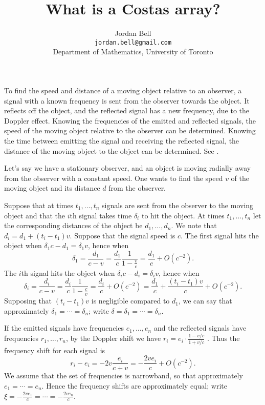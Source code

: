 \documentclass[10pt]{article}
\begin{document}
\title{What is a Costas array?}
\author{Jordan Bell\\ \texttt{jordan.bell@gmail.com}\\Department of Mathematics, University of Toronto}

\maketitle

To find the speed and distance
of a moving object relative to an observer,
a signal with a known frequency is sent from the observer towards the object.
It reflects off the object, and the reflected signal has a new frequency,
due to the Doppler effect. Knowing the frequencies of the emitted and
reflected signals, the speed
of the moving object relative to the observer can be determined.
Knowing the time between emitting the signal and receiving the
reflected signal, the distance of the moving object to the object
can be determined. See \cite[p. 74]{levanon}.

Let's say we have a stationary observer, and an object is moving radially
away from the observer with a constant speed. One wants to find the
speed $v$ of the moving object and its distance $d$
from the observer.   

Suppose that at times $t_1,\ldots,t_n$ signals are sent from the observer
to the moving object and that the $i$th signal takes time $\delta_i$
to hit the object.
At times $t_1,\ldots,t_n$ let the corresponding distances of the
object be $d_1,\ldots,d_n$. We note that
$d_i=d_1+(t_i-t_1)v$.
Suppose that the signal speed is $c$.
The first signal hits the object when $\delta_1 c-d_1=\delta_1 v$, hence when
\[
\delta_1=\frac{d_1}{c-v}=\frac{d_1}{c}\frac{1}{1-\frac{v}{c}}=\frac{d_1}{c}
+O(c^{-2}).
\]
The $i$th signal hits the object when $\delta_ic-d_i=\delta_iv$, hence when
\[
\delta_i=\frac{d_i}{c-v}=\frac{d_i}{c}\frac{1}{1-\frac{c}{v}}
=\frac{d_i}{c}+O(c^{-2})
=\frac{d_1}{c}+\frac{(t_i-t_1)v}{c}+O(c^{-2}).
\]
Supposing that $(t_i-t_1)v$ is negligible compared to $d_1$,
we can say that approximately $\delta_1=\cdots=\delta_n$;
write $\delta=\delta_1=\cdots=\delta_n$.

If the emitted signals have frequencies $e_1,\ldots,e_n$ and
the reflected signals have frequencies $r_1,\ldots,r_n$, 
by the Doppler shift we have $r_i=e_i\cdot \frac{1-v/c}{1+v/c}$
\cite[p. 4]{levanon}. Thus
the frequency shift for each signal is
\[
r_i-e_i=-2v\frac{e_i}{c+v}=-\frac{2ve_i}{c}+O(c^{-2}).
\]
We assume that the set of frequencies is narrowband, so that approximately
$e_1=\cdots=e_n$. Hence the frequency shifts are approximately equal;
write
$\xi=-\frac{2ve_1}{c}=\cdots=-\frac{2ve_n}{c}$.
\end{document}
